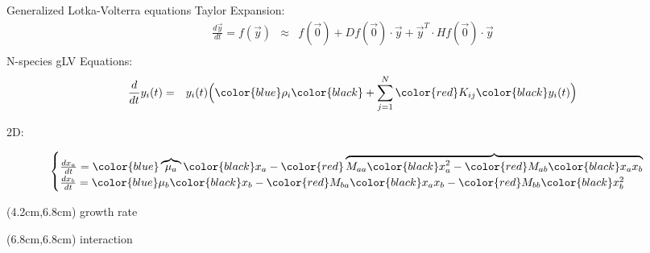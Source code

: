 \documentclass[15pt]{beamer}
\begin{document}
\begin{frame}{Generalized Lotka-Volterra equations}
Taylor Expansion:
\begin{eqnarray*}
\frac{d\vec{y}}{dt} = f(\vec{y}) &\approx& f(\vec{0})+ Df(\vec{0})\cdot \vec{y}+ \vec{y}^T \cdot Hf(\vec{0})\cdot \vec{y}\\
\end{eqnarray*}
N-species gLV Equations:
\begin{eqnarray*}
\frac{d}{dt}y_i(t) &=& y_i(t)\Big(\color{blue} \rho_i \color{black} + \sum_{j=1}^N \color{red} K_{ij} \color{black} y_i(t)\Big)
\end{eqnarray*}


2D: 

\[
 \begin{cases}
       \frac{dx_a}{dt} = \color {blue} \overbrace{\mu_a} \color{black} x_a -\color{red}\overbrace{M_{aa}\color{black} x_a^2- \color{red}M_{ab} \color{black} x_a x_b}\\
       \frac{dx_b}{dt} = \color {blue}\mu_b\color{black} x_b-\color{red}M_{ba}\color{black}x_ax_b-\color{red}M_{bb}\color{black}x_b^2\\
 \end{cases}
\]
\begin{textblock*}{6cm}(4.2cm,6.8cm) %
\color{blue} growth rate
\end{textblock*}
\begin{textblock*}{6cm}(6.8cm,6.8cm) %
\color{red} interaction \color{black}
\end{textblock*}
\end{frame}
\end{document}
